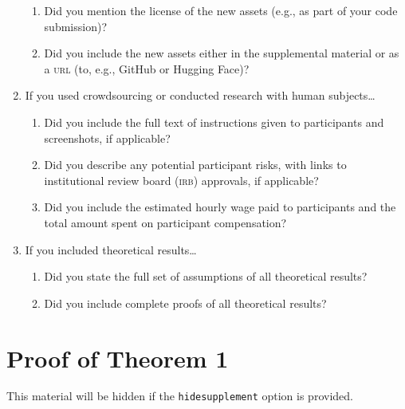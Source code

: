 \documentclass[11pt]{article}
\begin{document}
\begin{enumerate}
  \begin{enumerate}
    \item Did you mention the license of the new assets (e.g., as part of your
    code submission)?
    \answerTODO{}
    \item Did you include the new assets either in the supplemental material or as
    a \textsc{url} (to, e.g., GitHub or Hugging Face)?
    \answerTODO{}
  \end{enumerate}
\item If you used crowdsourcing or conducted research with human subjects\dots
  \begin{enumerate}
  \item Did you include the full text of instructions given to participants and
    screenshots, if applicable?
    \answerTODO{}
  \item Did you describe any potential participant risks, with links to
    institutional review board (\textsc{irb}) approvals, if applicable?
    \answerTODO{}
  \item Did you include the estimated hourly wage paid to participants and the
    total amount spent on participant compensation?
    \answerTODO{}
  \end{enumerate}
\item If you included theoretical results\dots
  \begin{enumerate}
  \item Did you state the full set of assumptions of all theoretical results?
    \answerTODO{}
  \item Did you include complete proofs of all theoretical results?
    \answerTODO{}
  \end{enumerate}
\end{enumerate}

\newpage
\appendix
\section{Proof of Theorem 1}

This material will be hidden if the \texttt{hidesupplement} option is provided.
\end{document}
